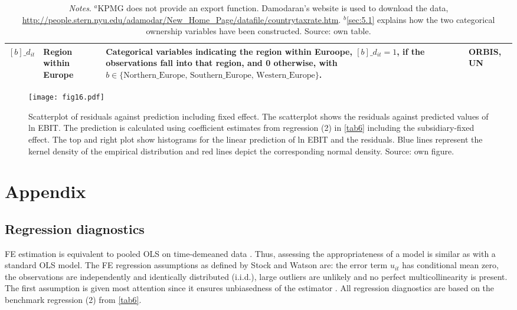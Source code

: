 \documentclass[10pt,twocolumn,oneside,cmyk]{article}
\begin{document}
\begin{table*}[t]
\begin{center}
\begin{tabularx}{\linewidth}{l l X l}
   $[b]\_d_{it}$ &Region within Europe &Categorical variables indicating the region within Euroope, $[b]\_d_{it}=1$, if the observations fall into that region, and 0 otherwise, with $b\in \{\text{Northern\_Europe, Southern\_Europe, Western\_Europe}\}$. &ORBIS, UN\\
   \bottomrule
   \end{tabularx}
  \caption*{\footnotesize{\textit{Notes}. $^a$KPMG does not provide an export function. Damodaran's website is used to download the data, \url{http://people.stern.nyu.edu/adamodar/New\_Home\_Page/datafile/countrytaxrate.htm}. $^b$\cref{sec:5.1} explains how the two categorical ownership variables have been constructed. Source: own table.}}
 \end{center}
\end{table*}

\begin{figure*}[!]
 \centering \captionsetup{width=0.95\textwidth}
   \texttt{[image: fig16.pdf]}
 \caption[Scatterplot of residuals against prediction including fixed effect]{Scatterplot of residuals against prediction including fixed effect. The scatterplot shows the residuals against predicted values of ln EBIT. The prediction is calculated using coefficient estimates from regression (2) in \cref{tab6} including the subsidiary-fixed effect. The top and right plot show histograms for the linear prediction of ln EBIT and the residuals. Blue lines represent the kernel density of the empirical distribution and red lines depict the corresponding normal density. Source: own figure.} \label{fig16}
\end{figure*}

\section{Appendix }\label{app:D}
\subsection{Regression diagnostics}\label{app:D1}
FE estimation is equivalent to pooled OLS on time-demeaned data \parencite[482]{wooldridge_introductory_2009}. Thus, assessing the appropriateness of a model is similar as with a standard OLS model. The FE regression assumptions as defined by Stock and Watson \textcite[404-406]{stock_introduction_2012} are: the error term $u_{it}$ has conditional mean zero, the observations are independently and identically distributed (i.i.d.), large outliers are unlikely and no perfect multicollinearity is present. The first assumption is given most attention since it ensures unbiasedness of the estimator \parencite[238, 404]{stock_introduction_2012}. All regression diagnostics are based on the benchmark regression (2) from \cref{tab6}.
\end{document}
